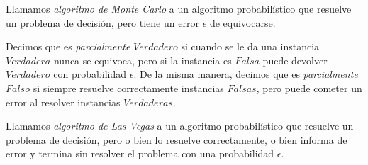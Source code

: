 
\begin{definition}
	Llamamos \textit{algoritmo de Monte Carlo} a un algoritmo probabilístico que resuelve un problema de decisión, pero tiene un error $\epsilon$ de equivocarse.
	
	Decimos que es \textit{parcialmente} $Verdadero$ si cuando se le da una instancia $Verdadera$ nunca se equivoca, pero si la instancia es $Falsa$ puede devolver $Verdadero$ con probabilidad $\epsilon$. De la misma manera, decimos que es \textit{parcialmente} $Falso$ si siempre resuelve correctamente instancias $Falsas$, pero puede cometer un error al resolver instancias $Verdaderas$.
\end{definition}


\begin{definition}
	Llamamos \textit{algoritmo de Las Vegas} a un algoritmo probabilístico que resuelve un problema de decisión, pero o bien lo resuelve correctamente, o bien informa de error y termina sin resolver el problema con una probabilidad $\epsilon$.
\end{definition}



